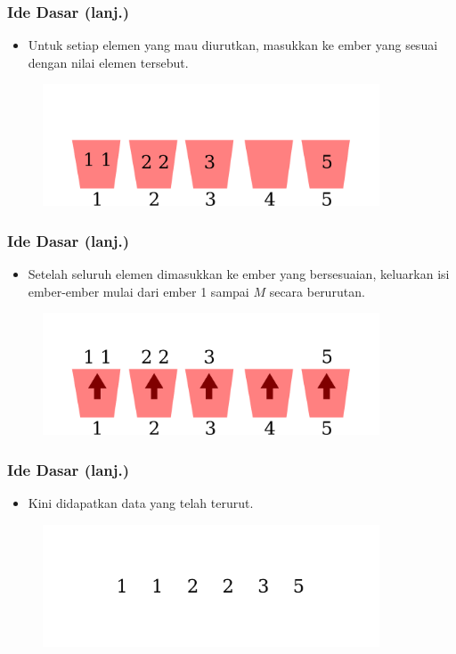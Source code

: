 \begin{frame}
\frametitle{Ide Dasar (lanj.)}
  \begin{itemize}
    \item Untuk setiap elemen yang mau diurutkan, masukkan ke ember yang
    sesuai dengan nilai elemen tersebut.
  \end{itemize}
  \begin{figure}
    \includegraphics[width=10cm]{asset/counting-sort-8.pdf}
  \end{figure}
\end{frame}

\begin{frame}
\frametitle{Ide Dasar (lanj.)}
  \begin{itemize}
    \item Setelah seluruh elemen dimasukkan ke ember yang
    bersesuaian, keluarkan isi ember-ember mulai dari ember 1
    sampai $M$ secara berurutan.
  \end{itemize}
  \begin{figure}
    \includegraphics[width=10cm]{asset/counting-sort-9.pdf}
  \end{figure}
\end{frame}

\begin{frame}
\frametitle{Ide Dasar (lanj.)}
  \begin{itemize}
    \item Kini didapatkan data yang telah terurut.
  \end{itemize}
  \begin{figure}
    \includegraphics[width=10cm]{asset/counting-sort-10.pdf}
  \end{figure}
\end{frame}

